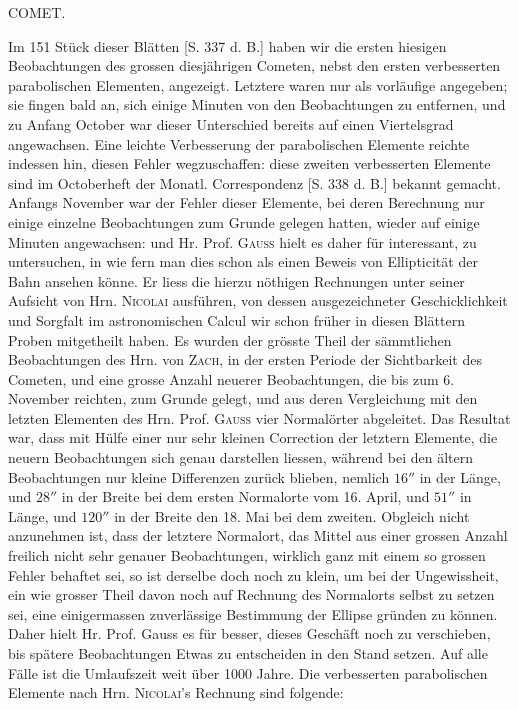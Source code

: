 \par{}\bigskip
\hypertarget{native-347-lower}{}\label{native-347-lower}
\begin{center}
\large COMET.
\end{center}

\par\indent Im 151 Stück dieser Blätten [S. 337 d. B.] haben wir die ersten hiesigen Beobachtungen des grossen diesjährigen Cometen, nebst den ersten verbesserten parabolischen Elementen, angezeigt. Letztere waren nur als vorläufige angegeben; sie fingen bald an, sich einige Minuten von den Beobachtungen zu entfernen, und zu Anfang October war dieser Unterschied bereits auf einen Viertelsgrad angewachsen. Eine leichte Verbesserung der parabolischen Elemente reichte indessen hin, diesen Fehler wegzuschaffen: diese zweiten verbesserten Elemente sind im Octoberheft der Monatl. Correspondenz [S. 338 d. B.] bekannt gemacht. Anfangs November war der Fehler dieser Elemente, bei deren Berechnung nur einige einzelne Beobachtungen zum Grunde gelegen hatten, wieder auf einige Minuten angewachsen: und Hr. Prof. \textsc{Gauss} hielt es daher für interessant, zu untersuchen, in wie fern man dies schon als einen Beweis von Ellipticität der Bahn ansehen könne. Er liess die hierzu nöthigen Rechnungen unter seiner Aufsicht von Hrn. \textsc{Nicolai} ausführen, von dessen ausgezeichneter Geschicklichkeit und Sorgfalt im astronomischen Calcul wir schon früher in diesen Blättern Proben mitgetheilt haben. Es wurden der grösste Theil der sämmtlichen Beobachtungen des Hrn. von \textsc{Zach}, in der ersten Periode der Sichtbarkeit des Cometen, und eine grosse Anzahl neuerer Beobachtungen, die bis zum 6. November reichten, zum Grunde gelegt, und aus deren Vergleichung mit den letzten Elementen des Hrn. Prof. \textsc{Gauss} vier Normalörter abgeleitet. Das Resultat war, dass mit Hülfe einer nur sehr kleinen Correction der letztern Elemente, die neuern Beobachtungen sich genau darstellen liessen, während bei den ältern Beobachtungen nur kleine Differenzen zurück blieben, nemlich $16''$ in der Länge, und $28''$ in der Breite bei dem ersten Normalorte vom 16. April, und $51''$ in Länge, und $120''$ in der Breite den 18. Mai bei dem zweiten. Obgleich nicht anzunehmen ist, dass der letztere Normalort, das Mittel aus einer grossen Anzahl freilich nicht sehr genauer Beobachtungen, wirklich ganz mit einem so grossen Fehler behaftet sei, so ist derselbe doch noch zu klein, um bei der Ungewissheit, ein wie grosser Theil davon noch auf Rechnung des Normalorts selbst zu setzen sei, eine einigermassen zuverlässige Bestimmung der Ellipse gründen zu können. Daher hielt Hr. Prof. Gauss es für besser, dieses Geschäft noch zu verschieben, bis spätere Beobachtungen Etwas zu entscheiden in den Stand setzen. Auf alle Fälle ist die Umlaufszeit weit über 1000 Jahre. Die verbesserten parabolischen Elemente nach Hrn. \textsc{Nicolai}'s Rechnung sind folgende:

